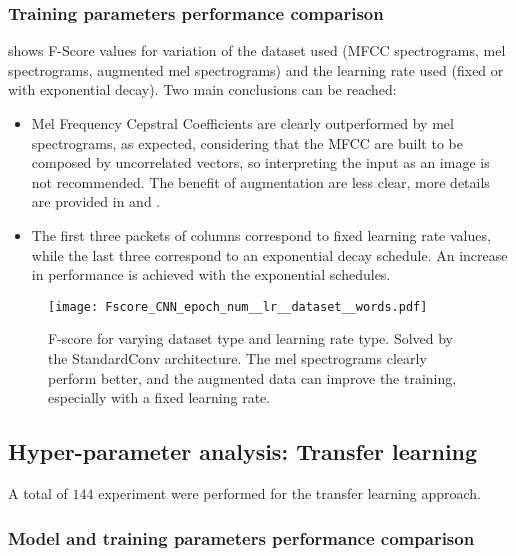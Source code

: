 \subsubsection{Training parameters performance comparison}

 shows F-Score values for
variation of
the dataset used (MFCC spectrograms, mel spectrograms, augmented mel spectrograms)
and the learning rate used (fixed or with exponential decay).
Two main conclusions can be reached:
\begin{itemize}
    \item 
        Mel Frequency Cepstral Coefficients are clearly outperformed by mel
        spectrograms, as expected, considering that the MFCC are built to be composed
        by uncorrelated vectors, so interpreting the input as an image is not
        recommended.
        The benefit of augmentation are less clear, more details are provided
        in  and
        .
    \item 
        The first three packets of columns correspond to fixed learning rate values,
        while the last three correspond to an exponential decay schedule.
        An increase in performance is achieved with the exponential schedules.
\end{itemize}

\begin{figure*}[h!]
    \centering
    \texttt{[image: Fscore\_CNN\_epoch\_num\_\_lr\_\_dataset\_\_words.pdf]}
    \caption{F-score for varying
        dataset type and learning rate type.
        Solved by the StandardConv architecture.
        The mel spectrograms clearly perform better, and the augmented data can
        improve the training, especially with a fixed learning rate.
    }%
    \label{fig:cnn_comparison_epoch_lr_dataset}
\end{figure*}

\subsection{Hyper-parameter analysis: Transfer learning}

A total of $144$ experiment were performed for the transfer learning approach.


\subsubsection{Model and training parameters performance comparison}

